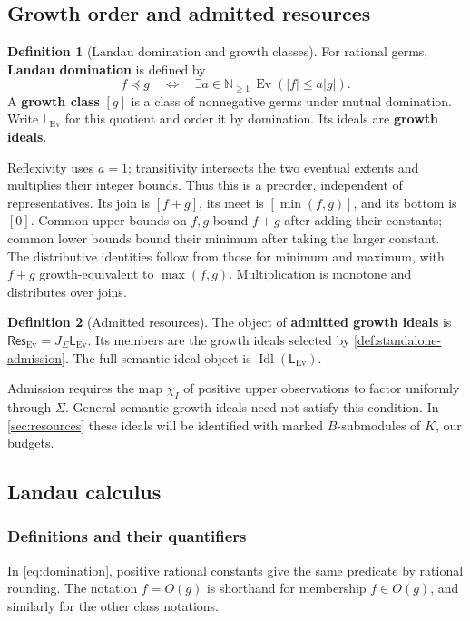 \documentclass[11pt,a4paper]{article}
\numberwithin{algorithm}{section}
\numberwithin{equation}{section}
\theoremstyle{definition}
\newtheorem{definition}[definition]{Definition}
\theoremstyle{remark}
\theoremstyle{plain}
\newcommand{\N}{\mathbb N}
\newcommand{\Idl}{\operatorname{Idl}}
\newcommand{\J}{J_{\Sigma}}
\newcommand{\Ev}{{\operatorname{Ev}}}
\newcommand{\abs}[1]{\lvert #1\rvert}
\theoremstyle{definition}
\theoremstyle{plain}
\begin{document}
\subsection{Growth order and admitted resources}
\label{sec:growth-order}


\begin{definition}[Landau domination and growth classes]\label{def:growth-classes}
For rational germs, \textbf{Landau domination} is defined by
\begin{equation}\label{eq:domination}
 f\preceq g\quad\Longleftrightarrow\quad
 \exists a\in\N_{\ge1}\,\Ev(\abs f\le a\abs g).
\end{equation}
A \textbf{growth class} $[g]$ is a class of nonnegative germs under
mutual domination. Write $\mathsf L_{\Ev}$ for this quotient and
order it by domination. Its ideals are \textbf{growth ideals}.
\end{definition}


Reflexivity uses $a=1$; transitivity intersects the two eventual
extents and multiplies their integer bounds. Thus this is a preorder,
independent of representatives.
Its join is $[f+g]$, its meet is $[\min(f,g)]$, and its bottom is $[0]$.
Common upper bounds on $f,g$ bound $f+g$ after adding their constants;
common lower bounds bound their minimum after taking the larger constant.
The distributive identities follow from those for minimum and maximum,
with $f+g$ growth-equivalent to $\max(f,g)$.
Multiplication is monotone and distributes over joins.

\begin{definition}[Admitted resources]\label{def:admitted}
The object of \textbf{admitted growth ideals} is
$\mathsf{Res}_{\Ev}=\J\mathsf L_{\Ev}$.
Its members are the growth ideals selected by
\cref{def:standalone-admission}. The full semantic ideal object is
$\Idl(\mathsf L_{\Ev})$.
\end{definition}
Admission requires the map $\chi_I$ of positive upper observations
to factor uniformly through $\Sigma$. General semantic growth ideals
need not satisfy this condition. In \cref{sec:resources} these ideals
will be identified with marked $B$-submodules of $K$, our budgets.

\subsection{Landau calculus}
\label{sec:landau}
\subsubsection{Definitions and their quantifiers}
In \eqref{eq:domination}, positive rational constants give the same
predicate by rational rounding. The notation $f=O(g)$ is shorthand for membership
$f\in O(g)$, and similarly for the other class notations.
\end{document}
